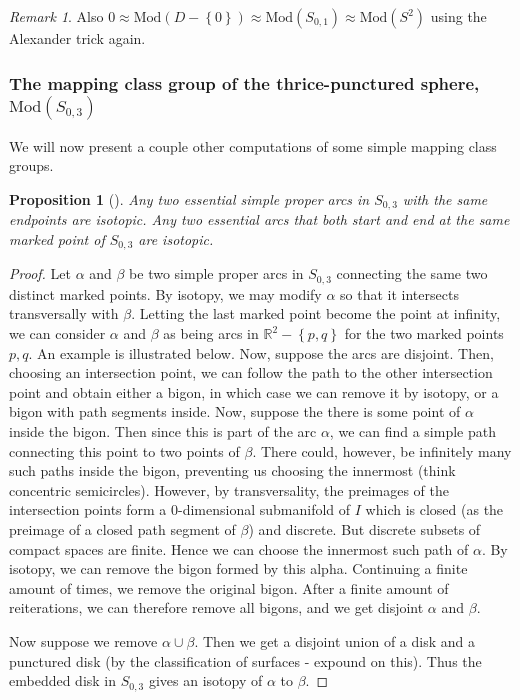 \documentclass[reqno]{amsart}
\newtheorem{proposition}[theorem]{Proposition}
\theoremstyle{definition}
\theoremstyle{remark}
\newtheorem*{remark}{Remark}
\newcommand{\Mod}{{\mathrm{Mod}}}
\begin{document}
\begin{remark}
    Also $0 \approx \Mod\left( D - \left\{ 0 \right\}  \right) 
    \approx \Mod \left( S_{0,1} \right) \approx
    \Mod\left( S^2 \right) $ using the Alexander trick again.
\end{remark}

\subsubsection*{The mapping class group of the thrice-punctured sphere,
$\Mod \left( S_{0,3} \right) $}


We will now present a couple other computations of
some simple mapping class groups.

\begin{proposition}[]\label{prop2.2}
    Any two essential simple proper arcs in $S_{0,3}$ with the
    same endpoints are isotopic. Any two essential arcs that both
    start and end at the same marked point of $S_{0,3}$ are isotopic.
\end{proposition}

\begin{proof}
    Let $\alpha$ and $\beta$ be two simple proper arcs in
    $S_{0,3}$ connecting the same two distinct marked points.
    By isotopy, we may modify $\alpha$ so that
    it intersects transversally with $\beta$.
    Letting the last marked point become the point at infinity,
    we can consider $\alpha$ and $\beta$ as being
    arcs in $\mathbb{R}^2 - \left\{ p,q \right\} $ for
    the two marked points $p,q$.
    An example is illustrated below.
    Now, suppose the arcs are disjoint.
    Then, choosing an intersection point, we can follow
    the path to the other intersection point and obtain
    either a bigon, in which case we can remove it by isotopy,
    or a bigon with path segments inside.
    Now, suppose
    the there is some point of $\alpha$ inside the bigon.
    Then since this is part of the arc $\alpha$, we can find
    a simple path connecting this point to two points
    of $\beta$. There could, however, be infinitely many
    such paths inside the bigon, preventing us choosing the
    innermost (think concentric semicircles).
    However, by transversality, the preimages of the 
    intersection points
    form a $0$-dimensional submanifold of $I$ which is closed
    (as the preimage of a closed path segment of $ \beta$)
    and discrete.
    But discrete subsets of compact spaces are finite. Hence
    we can choose the innermost such path of $ \alpha$.
    By isotopy, we can remove the bigon formed by  this alpha.
    Continuing a finite amount of times, we remove the original
    bigon. After a finite amount of reiterations, we can
    therefore remove all bigons, and we get
    disjoint $ \alpha$ and $\beta$.

    Now suppose we remove $\alpha \cup  \beta$. Then
    we get a disjoint union of a disk and a punctured
    disk (by the classification of surfaces - expound on this).
    \todo{}
    Thus the embedded disk in $S_{0,3}$ gives an isotopy
    of $\alpha$ to $\beta$.
\end{proof}
 
\end{document}
